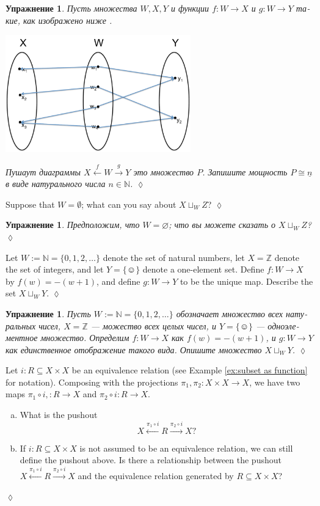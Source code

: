 \documentclass[a4paper]{book}
\def\ZZ{{\mathbb Z}}
\def\NN{{\mathbb N}}
\def\singleton{\{\smiley\}}
\def\to{\rightarrow}
\def\taking{\colon}
\def\ss{\subseteq}
\def\iso{\cong}
\def\ul{\underline}
\newcommand{\To}[1]{\xrightarrow{#1}}
\newcommand{\Too}[1]{\xrightarrow{\ \ #1\ \ }}
\newcommand{\From}[1]{\xleftarrow{#1}}
\newcommand{\Fromm}[1]{\xleftarrow{\ \ #1\ \ }}
\theoremstyle{myth}
\newtheorem{excENG}[envENG]{\begin{english}Exercise\end{english}}
\newenvironment{exerciseENG}{\begin{excENG}}{\hspace*{\fill}$\lozenge$\end{excENG}}
\newtheorem{excRUS}[envRUS]{Упражнение}
\newenvironment{exerciseRUS}{\begin{excRUS}}{\hspace*{\fill}$\lozenge$\end{excRUS}}
\def\sexc{\begin{enumerate}[a.)]\setlength{\itemsep}{.1cm}\setlength{\parskip}{.1cm}\item}
\def\next{\item}
\def\endsexc{\end{enumerate}}
\begin{document}
\begin{russian}
\begin{exerciseRUS}
Пусть множества $W,X,Y$ и функции $f\taking W\to X$ и $g\taking W\to Y$ такие, как изображено ниже . 
\begin{center}
\includegraphics[height=2in]{setPushout}
\end{center}
Пушаут диаграммы $X\Fromm{f}W\Too{g}Y$ это множество $P$. Запишите мощность $P\iso\ul{n}$ в виде натурального числа $n\in\NN$.  
\end{exerciseRUS}

\begin{exerciseENG}
Suppose that $W=\emptyset$; what can you say about $X\sqcup_WZ$? 
\end{exerciseENG}

\begin{exerciseRUS}
Предположим, что $W=\varnothing$; что вы можете сказать о $X\sqcup_WZ$? 
\end{exerciseRUS}

\begin{exerciseENG}
Let $W:=\NN=\{0,1,2,\ldots\}$ denote the set of natural numbers, let $X=\ZZ$ denote the set of integers, and let $Y=\singleton$ denote a one-element set. Define $f\taking W\to X$ by $f(w)= -(w+1)$, and define $g\taking W\to Y$ to be the unique map. Describe the set $X\sqcup_WY$.
\end{exerciseENG}

\begin{exerciseRUS}
Пусть $W:=\NN=\{0,1,2,\ldots\}$ обозначает множество всех натуральных чисел, $X=\ZZ$ — можество всех целых чисел, и $Y=\singleton$ — одноэлементное множество. Определим $f\taking W\to X$ как $f(w)= -(w+1)$, и $g\taking W\to Y$ как единственное отображение такого вида. Опишите множество $X\sqcup_WY$.
\end{exerciseRUS}

\begin{exerciseENG}
Let $i\taking R\ss X\times X$ be an equivalence relation (see Example \ref{ex:subset as function} for notation). Composing with the projections $\pi_1,\pi_2\taking X\times X\to X$, we have two maps $\pi_1\circ i,\taking R\to X$ and $\pi_2\circ i\taking R\to X$. 
\sexc What is the pushout $$X\From{\pi_1\circ i}R\To{\pi_2\circ i}X?$$ 
\next If $i\taking R\ss X\times X$ is not assumed to be an equivalence relation, we can still define the pushout above. Is there a relationship between the pushout $X\From{\pi_1\circ i}R\To{\pi_2\circ i}X$ and the equivalence relation generated by $R\ss X\times X$?
\endsexc
\end{exerciseENG}


\end{russian}
\end{document}
